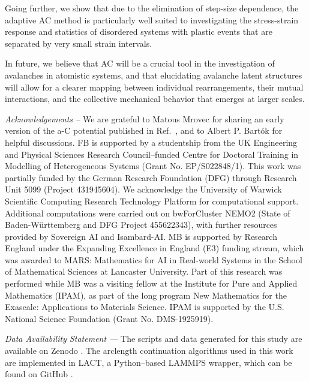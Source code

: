 \documentclass[aps,prl,reprint,superscriptaddress]{revtex4-2}
\begin{document}
Going further, we show that due to the elimination of step-size dependence, the adaptive AC method is particularly well suited to investigating the stress-strain response and statistics of disordered systems with plastic events that are separated by very small strain intervals.

In future, we believe that AC will be a crucial tool in the investigation of avalanches in atomistic systems, and that elucidating avalanche latent structures will allow for a clearer mapping between individual rearrangements, their mutual interactions, and the collective mechanical behavior that emerges at larger scales.

\emph{Acknowledgements --} We are grateful to Matous Mrovec for sharing an early version of the a-C potential published in Ref.~\cite{qamar2023atomic}, and to Albert P. Bartók for helpful discussions. FB is supported by a studentship from the UK Engineering and Physical Sciences Research Council–funded Centre for Doctoral Training in Modelling of Heterogeneous Systems (Grant No. EP/S022848/1). This work was partially funded by the German Research Foundation (DFG) through Research Unit 5099 (Project 431945604). We acknowledge the University of Warwick Scientific Computing Research Technology Platform for computational support. Additional computations were carried out on bwForCluster NEMO2 (State of Baden-Württemberg and DFG Project 455622343), with further resources provided by Sovereign AI and Isambard-AI.
MB is supported by Research England under the Expanding Excellence in England (E3) funding stream, which was awarded to MARS: Mathematics for AI in Real-world Systems in the School of Mathematical Sciences at Lancaster University. Part of this research was performed while MB was a visiting fellow at the Institute for Pure and Applied Mathematics (IPAM), as part of the long program New Mathematics for the Exascale: Applications to Materials Science. IPAM is supported by the U.S. National Science Foundation (Grant No. DMS-1925919).

\emph{Data Availability Statement —} The scripts and data generated for this study are available on Zenodo \cite{Birks2026ArclengthData}. The arclength continuation algorithms used in this work are implemented in LACT, a Python--based LAMMPS \cite{LAMMPS} wrapper, which can be found on GitHub \cite{Buze_LACT_LAMMPS_Continuation}.



\end{document}
